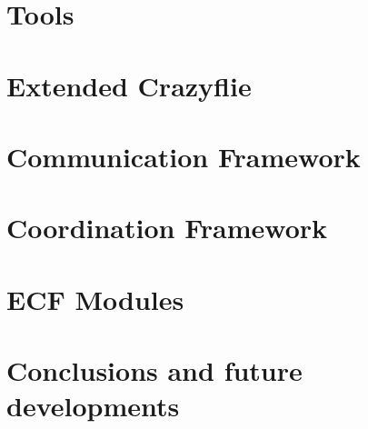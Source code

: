 \documentclass{Configuration_Files/PoliMi3i_thesis}
\begin{document}
\chapter{Tools}
\label{ch:tools}


\chapter{Extended Crazyflie}
\label{ch:ecf}


\chapter{Communication Framework}
\label{ch:communication}


\chapter{Coordination Framework}
\label{ch:coordination}


\chapter{ECF Modules}
\label{ch:modules}


\chapter{Conclusions and future developments}
\label{ch:conclusions}





\cleardoublepage
{} %
\end{document}
